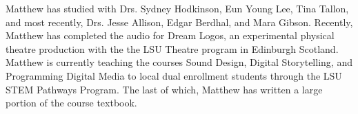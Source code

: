 Matthew has studied with Drs. Sydney Hodkinson, Eun Young Lee, Tina Tallon, and most recently, Drs. Jesse Allison, Edgar Berdhal, and Mara Gibson. Recently, Matthew has completed the audio for Dream Logos, an experimental physical theatre production with the the LSU Theatre program in Edinburgh Scotland. Matthew is currently teaching the courses Sound Design, Digital Storytelling, and Programming Digital Media to local dual enrollment students through the LSU STEM Pathways Program. The last of which, Matthew has written a large portion of the course textbook.


